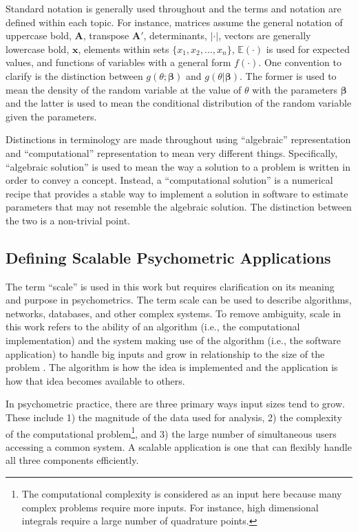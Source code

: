 \documentclass[12pt]{article}
\begin{document}
Standard notation is generally used throughout and the terms and notation are defined within each topic. For instance, matrices assume the general notation of uppercase bold, $\bm{A}$, transpose $\bm{A}'$, determinants, $|\cdot|$, vectors are generally lowercase bold, $\bm{x}$, elements within sets $\{x_1, x_2, \ldots, x_n\}$, $\mathbb{E}(\cdot)$ is used for expected values, and functions of variables with a general form $f(\cdot)$. One convention to clarify is the distinction between $g(\theta;\bm{\beta})$ and $g(\theta|\bm{\beta})$. The former is used to mean the density of the random variable at the value of $\theta$ with the parameters $\bm{\beta}$ and the latter is used to mean the conditional distribution of the random variable given the parameters. 

Distinctions in terminology are made throughout using ``algebraic'' representation and ``computational'' representation to mean very different things. Specifically, ``algebraic solution'' is used to mean the way a solution to a problem is written in order to convey a concept. Instead, a ``computational solution'' is a numerical recipe that provides a stable way to implement a solution in software to estimate parameters that may not resemble the algebraic solution. The distinction between the two is a non-trivial point.                           

\subsection*{Defining Scalable Psychometric Applications}

The term ``scale'' is used in this work but requires clarification on its meaning and purpose in psychometrics. The term scale can be used to describe algorithms, networks, databases, and other complex systems. To remove ambiguity, scale in this work refers to the ability of an algorithm (i.e., the computational implementation) and the system making use of the algorithm (i.e., the software application) to handle big inputs and grow in relationship to the size of the problem \cite{teng}. The algorithm is how the idea is implemented and the application is how that idea becomes available to others.

In psychometric practice, there are three primary ways input sizes tend to grow. These include 1) the magnitude of the data used for analysis, 2) the complexity of the computational problem\footnote{The computational complexity is considered as an input here because many complex problems require more inputs. For instance, high dimensional integrals require a large number of quadrature points.}, and 3) the large number of simultaneous users accessing a common system. A scalable application is one that can flexibly handle all three components efficiently. 
\end{document}
